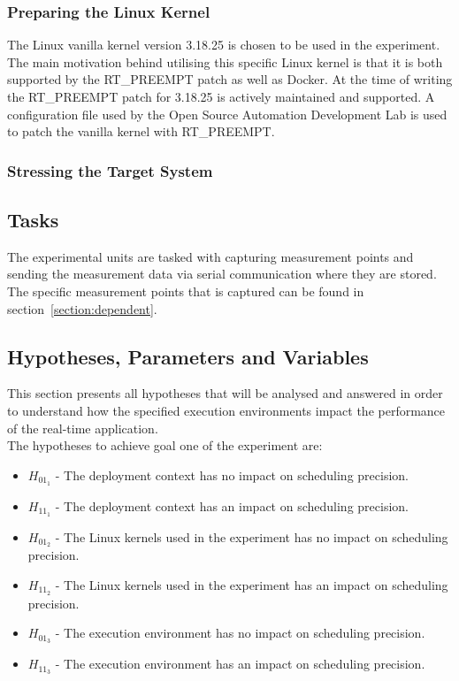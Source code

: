 \subsubsection{Preparing the Linux Kernel}
The Linux vanilla kernel version 3.18.25 is chosen to be used in the experiment. The main motivation behind utilising this specific Linux kernel is that it is both supported by the RT\_PREEMPT patch as well as Docker. At the time of writing the RT\_PREEMPT patch for 3.18.25 is actively maintained and supported. A configuration file used by the Open Source Automation Development Lab \cite{OSADL} is used to patch the vanilla kernel with RT\_PREEMPT.

\subsubsection{Stressing the Target System}



\subsection{Tasks}
The experimental units are tasked with capturing measurement points and sending the measurement data via serial communication where they are stored. The specific measurement points that is captured can be found in section~\ref{section:dependent}.


\subsection{Hypotheses, Parameters and Variables}
This section presents all hypotheses that will be analysed and answered in order to understand how the specified execution environments impact the performance of the real-time application.\\

The hypotheses to achieve goal one of the experiment are:
\begin{itemize}
\item $H_{01_{1}}$ - The deployment context has no impact on scheduling precision.
\item $H_{11_{1}}$ - The deployment context has an impact on scheduling precision.
\item $H_{01_{2}}$ - The Linux kernels used in the experiment has no impact on scheduling precision.
\item $H_{11_{2}}$ - The Linux kernels used in the experiment has an impact on scheduling precision.
\item $H_{01_{3}}$ - The execution environment has no impact on scheduling precision.
\item $H_{11_{3}}$ - The execution environment has an impact on scheduling precision.\\
\end{itemize}


